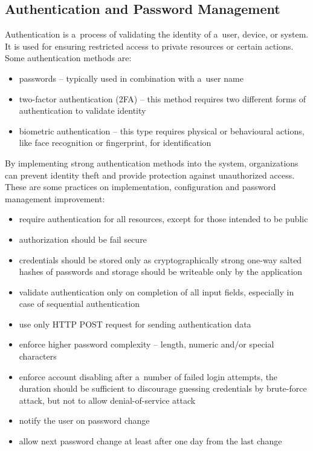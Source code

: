   \subsection*{Authentication and Password Management}
    Authentication is a~process of validating the identity of a~user, device, or system. It is used for
    ensuring restricted access to private resources or certain actions. Some authentication methods
    are:
    \begin{itemize}
      \item passwords -- typically used in combination with a~user name
      \item two-factor authentication (2FA) -- this method requires two different forms of authentication
            to validate identity
      \item biometric authentication -- this type requires physical or behavioural actions, like
            face recognition or fingerprint, for identification
    \end{itemize}
    By implementing strong authentication methods into the system, organizations can prevent identity theft
    and provide protection against unauthorized access. These are some practices on implementation, configuration
    and password management improvement:
    \begin{itemize}
      \item require authentication for all resources, except for those intended to be public
      \item authorization should be fail secure
      \item credentials should be stored only as cryptographically strong one-way salted hashes of passwords
            and storage should be writeable only by the application
      \item validate authentication only on completion of all input fields, especially in case of sequential
            authentication
      \item use only HTTP POST request for sending authentication data
      \item enforce higher password complexity -- length, numeric and/or special characters
      \item enforce account disabling after a~number of failed login attempts, the duration should
            be sufficient to discourage guessing credentials by brute-force attack, but not to allow
            denial-of-service attack
      \item notify the user on password change
      \item allow next password change at least after one day from the last change
    \end{itemize}

